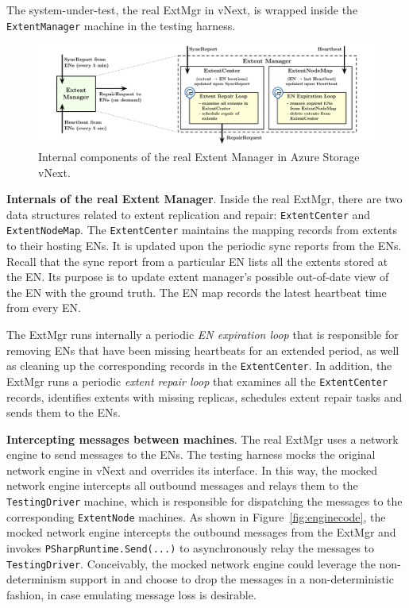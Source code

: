 The system-under-test, the real ExtMgr in vNext, is wrapped inside the \texttt{ExtentManager} \psharp machine in the testing harness.

\begin{figure}[t]
\centering
\includegraphics[width=.9\linewidth]{img/extent_manager}
\caption{Internal components of the real Extent Manager in Azure Storage vNext.}
\label{fig:extentmanager}
\end{figure}

\textbf{Internals of the real Extent Manager}.
Inside the real ExtMgr, there are two data structures related to extent replication and repair: \texttt{ExtentCenter} and \texttt{ExtentNodeMap}. The \texttt{ExtentCenter} maintains the mapping records from extents to their hosting ENs. It is updated upon the periodic sync reports from the ENs. Recall that the sync report from a particular EN lists all the extents stored at the EN. Its purpose is to update extent manager's possible out-of-date view of the EN with the ground truth. The EN map records the latest heartbeat time from every EN.

The ExtMgr runs internally a periodic {\em EN expiration loop} that is responsible for removing ENs that have been missing heartbeats for an extended period, as well as cleaning up the corresponding records in the \texttt{ExtentCenter}. In addition, the ExtMgr runs a periodic {\em extent repair loop} that examines all the \texttt{ExtentCenter} records, identifies extents with missing replicas, schedules extent repair tasks and sends them to the ENs.

\textbf{Intercepting messages between machines}.
The real ExtMgr uses a network engine to send messages to the ENs. The testing harness mocks the original network engine in vNext and overrides its interface. In this way, the mocked network engine intercepts all outbound messages and relays them to the \texttt{TestingDriver} machine, which is responsible for dispatching the messages to the corresponding \texttt{ExtentNode} machines. As shown in Figure~\ref{fig:enginecode}, the mocked network engine intercepts the outbound messages from the ExtMgr and invokes \texttt{PSharpRuntime.Send(...)} to asynchronously relay the messages to \texttt{TestingDriver}. Conceivably, the mocked network engine could leverage the non-determinism support in \psharp and choose to drop the messages in a non-deterministic fashion, in case emulating message loss is desirable. 

